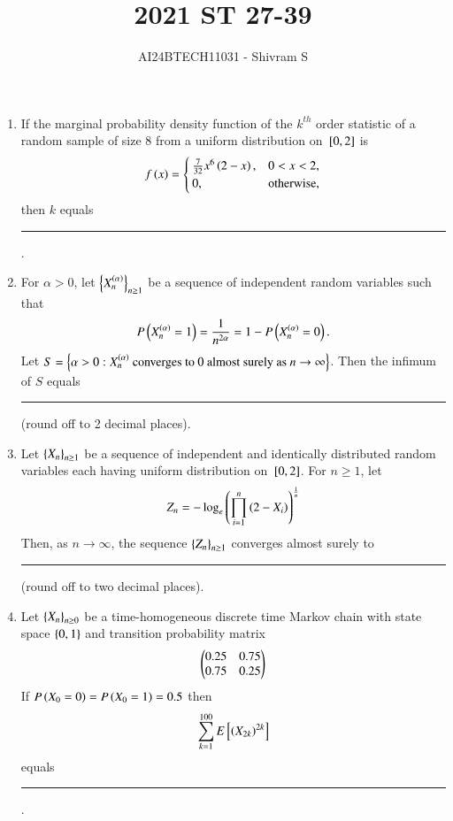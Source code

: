 \documentclass[journal]{IEEEtran}
\begin{document}

\onecolumn

\title{2021 ST 27-39}
\author{AI24BTECH11031 - Shivram S}
\maketitle
\bigskip
\renewcommand{\thefigure}{\theenumi}
\renewcommand{\thetable}{\theenumi}

\begin{enumerate}
    \item If the marginal probability density function of the $k^{th}$ order statistic of a random sample of size 8 from a
    uniform distribution on ${}\left[0,2\right]$ is
    \begin{align*}    
    f\left(x\right) = 
    \begin{cases} 
    \frac{7}{32}x^6\left(2 - x\right), & 0 < x < 2, \\
    0, & \text{otherwise}, 
    \end{cases}
    \end{align*}
    then $k$ equals \rule{1.0cm}{0.15mm}.

    \item For $\alpha > 0$, let $\left\{X_n^{\left(\alpha\right)}\right\}_{n\ge1}$ be a sequence of independent random
    variables such that 
    \begin{align*}
    P\left(X_n^{\left(\alpha\right)} = 1\right) = \frac{1}{n^{2\alpha}} = 1 - P\left(X_n^{\left(\alpha\right)} = 0\right).
    \end{align*}
    Let $S = \left\{\alpha > 0 : X_n^{\left(\alpha\right)} \text{ converges to } 0 \text{ almost surely as } n \to \infty\right\}$.
    Then the infimum of $S$ equals \rule{1.0cm}{0.15mm} (round off to 2 decimal places).

    \item Let $\left\{X_n\right\}_{n \ge 1}$ be a sequence of independent and identically distributed random variables each
    having uniform distribution on ${}\left[0, 2\right]$. For $n \ge 1$, let
    \begin{align*}
        Z_n = -\log_e \left(\prod_{i=1}^n \left(2 - X_i\right)\right)^{\frac{1}{n}}
    \end{align*}
    Then, as $n \to \infty$, the sequence $\left\{Z_n\right\}_{n \ge 1}$ converges almost surely to
    \rule{1.0cm}{0.15mm} (round off to two decimal places).
    
    \item Let $\left\{X_n\right\}_{n \ge 0}$ be a time-homogeneous discrete time Markov chain with state space 
    $\left\{0, 1\right\}$ and transition probability matrix
    \begin{align*}
        \begin{pmatrix}
            0.25 & 0.75 \\
            0.75 & 0.25
        \end{pmatrix}
    \end{align*}
    If $P\left(X_0 = 0\right) = P\left(X_0 = 1\right) = 0.5$ then
    \begin{align*}
        \sum_{k=1}^{100} E{}\left[\left(X_{2k}\right)^{2k}\right]
    \end{align*}
    equals \rule{1.0cm}{0.15mm}.


\end{enumerate}
\end{document}

